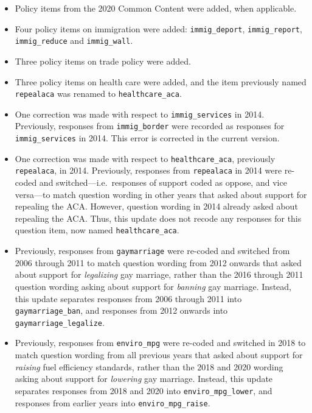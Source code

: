 \documentclass[
  12pt]{article}
\begin{document}
\begin{itemize}
\item
  Policy items from the 2020 Common Content were added, when applicable.
\item
  Four policy items on immigration were added: \texttt{immig\_deport},
  \texttt{immig\_report}, \texttt{immig\_reduce} and
  \texttt{immig\_wall}.
\item
  Three policy items on trade policy were added.
\item
  Three policy items on health care were added, and the item previously
  named \texttt{repealaca} was renamed to \texttt{healthcare\_aca}.
\item
  One correction was made with respect to \texttt{immig\_services} in
  2014. Previously, responses from \texttt{immig\_border} were recorded
  as responses for \texttt{immig\_services} in 2014. This error is
  corrected in the current version.
\item
  One correction was made with respect to \texttt{healthcare\_aca},
  previously \texttt{repealaca}, in 2014. Previously, responses from
  \texttt{repealaca} in 2014 were re-coded and switched---i.e.~responses
  of support coded as oppose, and vice versa---to match question wording
  in other years that asked about support for repealing the ACA.
  However, question wording in 2014 already asked about repealing the
  ACA. Thus, this update does not recode any responses for this question
  item, now named \texttt{healthcare\_aca}.
\item
  Previously, responses from \texttt{gaymarriage} were re-coded and
  switched from 2006 through 2011 to match question wording from 2012
  onwards that asked about support for \emph{legalizing} gay marriage,
  rather than the 2016 through 2011 question wording asking about
  support for \emph{banning} gay marriage. Instead, this update
  separates responses from 2006 through 2011 into
  \texttt{gaymarriage\_ban}, and responses from 2012 onwards into
  \texttt{gaymarriage\_legalize}.
\item
  Previously, responses from \texttt{enviro\_mpg} were re-coded and
  switched in 2018 to match question wording from all previous years
  that asked about support for \emph{raising} fuel efficiency standards,
  rather than the 2018 and 2020 wording asking about support for
  \emph{lowering} gay marriage. Instead, this update separates responses
  from 2018 and 2020 into \texttt{enviro\_mpg\_lower}, and responses
  from earlier years into \texttt{enviro\_mpg\_raise}.
\end{itemize}
\end{document}
